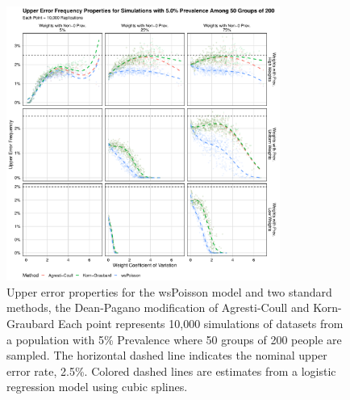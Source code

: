 \documentclass[AMA,STIX1COL]{WileyNJD-v2}
\begin{document}
\begin{figure}
\centering
\includegraphics[width=0.8\textwidth]{figures/perfect_upper_error_frequency_50_groups_0_05_prev.pdf}
\caption{Upper error properties for the wsPoisson model and two standard methods, the Dean-Pagano modification of Agresti-Coull and Korn-Graubard
Each point represents 10,000 simulations of datasets from a population with 5\% Prevalence where 50 groups of 200 people are sampled.
The horizontal dashed line indicates the nominal upper error rate, 2.5\%.
Colored dashed lines are estimates from a logistic regression model using cubic splines.}
\label{fig:perfect_upper_error_frequency_50_groups_0_05_prev}
\end{figure}
\end{document}
